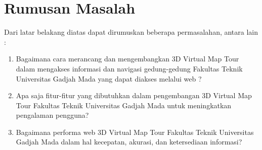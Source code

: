 

\section{Rumusan Masalah}

Dari latar belakang diatas dapat dirumuskan beberapa permasalahan, antara lain :

\begin{enumerate}
	\item Bagaimana cara merancang dan mengembangkan 3D Virtual Map Tour dalam mengakses informasi dan navigasi gedung-gedung Fakultas Teknik Universitas Gadjah Mada yang dapat diakses melalui web  ?
	
	\item Apa saja fitur-fitur yang dibutuhkan dalam pengembangan 3D Virtual Map Tour Fakultas Teknik Universitas Gadjah Mada untuk meningkatkan pengalaman pengguna?

	\item Bagaimana performa web 3D Virtual Map Tour Fakultas Teknik Universitas Gadjah Mada dalam hal kecepatan, akurasi, dan ketersediaan informasi?
	

\end{enumerate}
	


	
		
